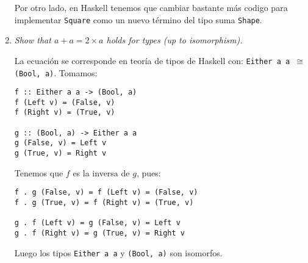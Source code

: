 \documentclass[11pt]{article}
\begin{document}
\begin{enumerate}
Por otro lado, en Haskell tenemos que cambiar bastante más codigo para implementar \texttt{Square} como un nuevo término del tipo suma \texttt{Shape}.

\item \textit{Show that $a+a=2 \times a$ holds for types (up to isomorphism).}

La ecuación se corresponde en teoría de tipos de Haskell con: \texttt{Either a a $\cong$ (Bool, a)}. Tomamos:
\begin{lstlisting}
f :: Either a a -> (Bool, a)
f (Left v) = (False, v)
f (Right v) = (True, v)

g :: (Bool, a) -> Either a a
g (False, v) = Left v
g (True, v) = Right v
\end{lstlisting}
Tenemos que $f$ es la inversa de $g$, pues:
\begin{lstlisting}
f . g (False, v) = f (Left v) = (False, v)
f . g (True, v) = f (Right v) = (True, v)

g . f (Left v) = g (False, v) = Left v
g . f (Right v) = g (True, v) = Right v
\end{lstlisting}

Luego los tipos \texttt{Either a a} y \texttt{(Bool, a)} son isomorfos.
\end{enumerate}
\end{document}
